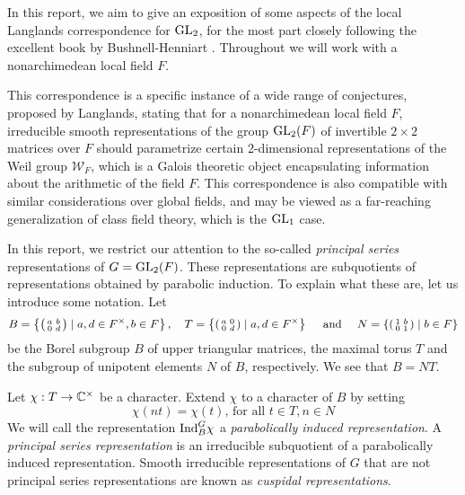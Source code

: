 
In this report, we aim to give an exposition of some aspects of the local Langlands correspondence for $\mathrm{GL}_2$, for the most part closely following the excellent book by Bushnell-Henniart \cite{BH1}. Throughout we will work with a nonarchimedean local field $F$.

This correspondence is a specific instance of a wide range of conjectures, proposed by Langlands, stating that for a nonarchimedean local field $F$, irreducible smooth representations of the group $\mathrm{GL}_2(F)$ of invertible $2\times 2$ matrices over $F$ should parametrize certain 2-dimensional representations of the Weil group $\mathcal{W}_F$, which is a Galois theoretic object encapsulating information about the arithmetic of the field $F$. This correspondence is also compatible with similar considerations over global fields, and may be viewed as a far-reaching generalization of class field theory, which is the $\mathrm{GL}_1$ case. 

In this report, we restrict our attention to the so-called \emph{principal series} representations of $G = \mathrm{GL}_2(F)$. These representations are subquotients of representations obtained by parabolic induction. To explain what these are, let us introduce some notation. Let $$B=\left\{\begin{psmallmatrix} a&b\\0&d\end{psmallmatrix} \mid a,d \in F^\times, b \in F\right\},\quad T=\left\{\begin{psmallmatrix}
	a&0\\0&d
\end{psmallmatrix}\mid a,d \in F^\times\right\}\quad\text{ and }\quad N=\left\{\begin{psmallmatrix}
	1&b\\0&1
\end{psmallmatrix}\mid b \in F\right\}$$ be the Borel subgroup $B$ of upper triangular matrices, the maximal torus $T$ and the subgroup of unipotent elements $N$ of $B$, respectively. We see that $B = NT$.
\begin{defn}
	Let $\chi: T\to \mathbb{C}^\times$ be a character. Extend $\chi$ to a character of $B$ by setting
	\[\chi(nt) = \chi(t)\text{, for all } t\in T, n\in N\]
	We will call the representation $\mathrm{Ind}_B^G \chi$ a \emph{parabolically induced representation}. A \emph{principal series representation} is an irreducible subquotient of a parabolically induced representation. Smooth irreducible representations of $G$ that are not principal series representations are known as \emph{cuspidal representations}.
\end{defn}

